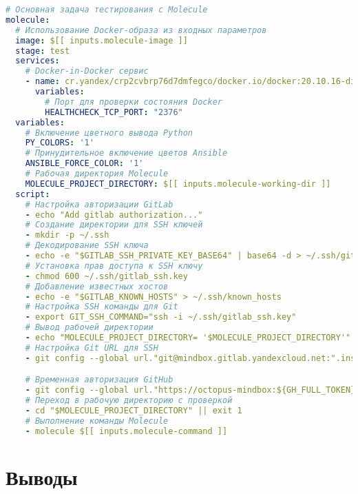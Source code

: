 \begin{lstlisting}[language=yaml,label={lst:component-pipeline}]
# Основная задача тестирования с Molecule
molecule:
  # Использование Docker-образа из входных параметров
  image: $[[ inputs.molecule-image ]]
  stage: test
  services:
    # Docker-in-Docker сервис
    - name: cr.yandex/crp2cvbrp76d7dmfegco/docker.io/docker:20.10.16-dind
      variables:
        # Порт для проверки состояния Docker
        HEALTHCHECK_TCP_PORT: "2376"
  variables:
    # Включение цветного вывода Python
    PY_COLORS: '1'
    # Принудительное включение цветов Ansible
    ANSIBLE_FORCE_COLOR: '1'
    # Рабочая директория Molecule
    MOLECULE_PROJECT_DIRECTORY: $[[ inputs.molecule-working-dir ]]
  script:
    # Настройка авторизации GitLab
    - echo "Add gitlab authorization..."
    # Создание директории для SSH ключей
    - mkdir -p ~/.ssh
    # Декодирование SSH ключа
    - echo -e "$GITLAB_SSH_PRIVATE_KEY_BASE64" | base64 -d > ~/.ssh/gitlab_ssh.key
    # Установка прав доступа к SSH ключу
    - chmod 600 ~/.ssh/gitlab_ssh.key
    # Добавление известных хостов
    - echo -e "$GITLAB_KNOWN_HOSTS" > ~/.ssh/known_hosts
    # Настройка SSH команды для Git
    - export GIT_SSH_COMMAND="ssh -i ~/.ssh/gitlab_ssh.key"
    # Вывод рабочей директории
    - echo "MOLECULE_PROJECT_DIRECTORY= '$MOLECULE_PROJECT_DIRECTORY'"
    # Настройка Git URL для SSH
    - git config --global url."git@mindbox.gitlab.yandexcloud.net:".insteadOf "https://mindbox.gitlab.yandexcloud.net/"

    # Временная авторизация GitHub
    - git config --global url."https://octopus-mindbox:${GH_FULL_TOKEN}@github.com/mindbox-cloud".insteadOf "https://github.com/mindbox-cloud"
    # Переход в рабочую директорию с проверкой
    - cd "$MOLECULE_PROJECT_DIRECTORY" || exit 1
    # Выполнение команды Molecule
    - molecule $[[ inputs.molecule-command ]]
\end{lstlisting}

\section{Выводы} \label{sec:conclusion}
